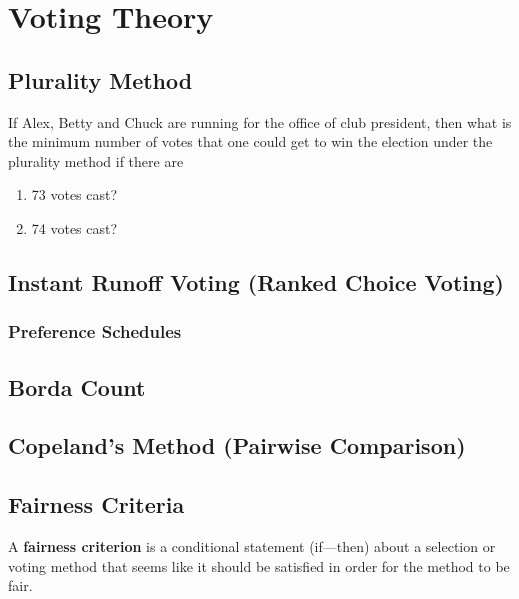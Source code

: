 \chapter{Voting Theory}%
\label{chap:voting-theory}

\section{Plurality Method}%
\label{sec:plurality-method}

\begin{exercise}
  If Alex, Betty and Chuck are running for the office of club
  president, then what is the minimum number of votes that one could
  get to win the election under the plurality method if there are
  \begin{enumerate}
  \item 73 votes cast?
  \item 74 votes cast?
  \end{enumerate}
\end{exercise}

\section{Instant Runoff Voting (Ranked Choice Voting)}%
\label{sec:irv}

\subsection{Preference Schedules}%
\label{sub:preference-schedules}

\section{Borda Count}%
\label{sec:borda-count}


\section{Copeland's Method (Pairwise Comparison)}%
\label{sec:copelands-method}


\section{Fairness Criteria}%
\label{sec:fairness criteria}

\begin{definition}
  A \textbf{fairness criterion} is a conditional statement (if---then)
  about a selection or voting method that seems like it should be
  satisfied in order for the method to be fair.
\end{definition}

